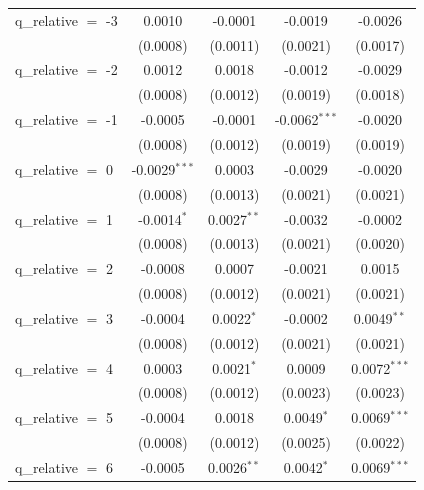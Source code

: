 \begin{tabular}{lcccc}
   q\_relative $=$ -3   & 0.0010                 & -0.0001        & -0.0019         & -0.0026\\   
                        & (0.0008)               & (0.0011)       & (0.0021)        & (0.0017)\\   
   q\_relative $=$ -2   & 0.0012                 & 0.0018         & -0.0012         & -0.0029\\   
                        & (0.0008)               & (0.0012)       & (0.0019)        & (0.0018)\\   
   q\_relative $=$ -1   & -0.0005                & -0.0001        & -0.0062$^{***}$ & -0.0020\\   
                        & (0.0008)               & (0.0012)       & (0.0019)        & (0.0019)\\   
   q\_relative $=$ 0    & -0.0029$^{***}$        & 0.0003         & -0.0029         & -0.0020\\   
                        & (0.0008)               & (0.0013)       & (0.0021)        & (0.0021)\\   
   q\_relative $=$ 1    & -0.0014$^{*}$          & 0.0027$^{**}$  & -0.0032         & -0.0002\\   
                        & (0.0008)               & (0.0013)       & (0.0021)        & (0.0020)\\   
   q\_relative $=$ 2    & -0.0008                & 0.0007         & -0.0021         & 0.0015\\   
                        & (0.0008)               & (0.0012)       & (0.0021)        & (0.0021)\\   
   q\_relative $=$ 3    & -0.0004                & 0.0022$^{*}$   & -0.0002         & 0.0049$^{**}$\\   
                        & (0.0008)               & (0.0012)       & (0.0021)        & (0.0021)\\   
   q\_relative $=$ 4    & 0.0003                 & 0.0021$^{*}$   & 0.0009          & 0.0072$^{***}$\\   
                        & (0.0008)               & (0.0012)       & (0.0023)        & (0.0023)\\   
   q\_relative $=$ 5    & -0.0004                & 0.0018         & 0.0049$^{*}$    & 0.0069$^{***}$\\   
                        & (0.0008)               & (0.0012)       & (0.0025)        & (0.0022)\\   
   q\_relative $=$ 6    & -0.0005                & 0.0026$^{**}$  & 0.0042$^{*}$    & 0.0069$^{***}$\\   

\end{tabular}

